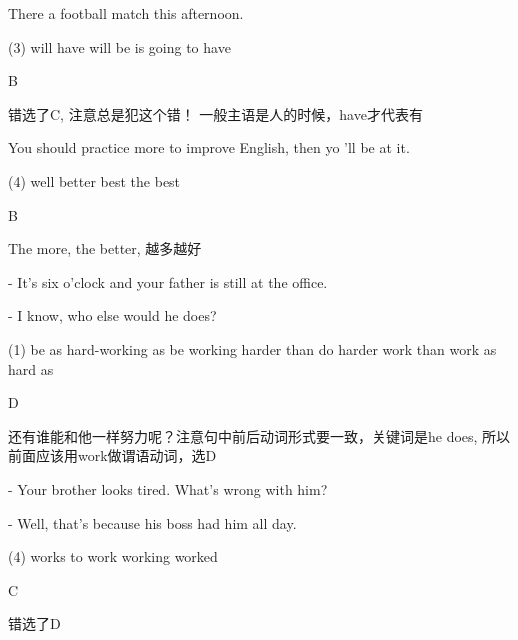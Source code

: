 \begin{question}[tags={xiaoxuect}]
There \blank*[width=1.4cm]{} a football match this afternoon.

  \begin{tasks}(3)
    \task will have
    \task will be
    \task is going to have
  \end{tasks}

\end{question}
\begin{solution}
B

错选了C, 注意总是犯这个错！ 一般主语是人的时候，have才代表有
\end{solution}



\begin{question}[tags={xiaoxuect}]
You should practice more to improve English, then yo 'll be \blank*[width=1.4cm]{} at it.

  \begin{tasks}(4)
    \task well
    \task better
    \task best
    \task the best
  \end{tasks}

\end{question}
\begin{solution}
B

The more, the better, 越多越好
\end{solution}

\begin{question}[tags={xiaoxuect}]
- It's six o'clock and your father is still at the office.

- I know, who else would \blank[width=1cm]{} he does?

  \begin{tasks}(1)
    \task be as hard-working as
    \task be working harder than
    \task do harder work than
    \task work as hard as
  \end{tasks}

\end{question}
\begin{solution}
D

还有谁能和他一样努力呢？注意句中前后动词形式要一致，关键词是he does, 所以前面应该用work做谓语动词，选D
\end{solution}

\begin{question}[tags={xiaoxuect}]
- Your brother looks tired. What's wrong with him?

- Well, that's because his boss had him \blank[width=1cm]{} all day.

  \begin{tasks}(4)
    \task works
    \task to work
    \task working
    \task worked
  \end{tasks}

\end{question}
\begin{solution}
C

错选了D
\end{solution}


